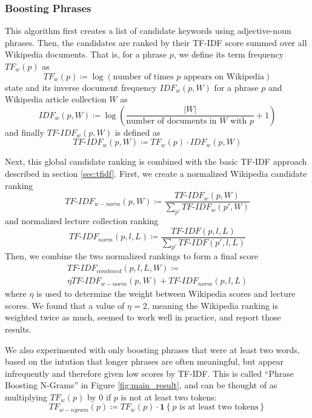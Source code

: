 \subsubsection{Boosting Phrases}

This algorithm first creates a list of candidate keywords using adjective-noun phrases. Then, the candidates are ranked by their TF-IDF score summed over all Wikipedia documents. That is, for a phrase $p$, we define its term frequency $TF_w(p)$ as
\begin{equation*}
TF_w(p) \coloneqq \log\left(\text{number of times } p \text{ appears on Wikipedia}\right)
\end{equation*}state
and its inverse document frequency $IDF_w(p, W)$ for a phrase $p$ and Wikipedia article collection $W$ as
\begin{equation*}
IDF_w(p, W) \coloneqq \log\left(\frac{|W|}{\text{number of documents in } W \text{ with } p} + 1\right)
\end{equation*}
and finally $TF\text{-}IDF_w(p, W)$ is defined as
\begin{equation*}
TF\text{-}IDF_w(p, W) \coloneqq TF_w(p) \cdot IDF_w(p, W)
\end{equation*}

Next, this global candidate ranking is combined with the basic TF-IDF approach described in section \ref{sec:tfidf}. First, we create a normalized Wikipedia candidate ranking
\begin{equation*}
TF\text{-}IDF_{w-norm}(p, W) \coloneqq \frac{TF\text{-}IDF_w(p, W)}{\sum_{p'} TF\text{-}IDF_w(p', W)}
\end{equation*}
and normalized lecture collection ranking
\begin{equation*}
TF\text{-}IDF_{norm}(p, l, L) \coloneqq \frac{TF\text{-}IDF(p, l, L)}{\sum_{p'} TF\text{-}IDF(p', l, L)}
\end{equation*}
Then, we combine the two normalized rankings to form a final score
\begin{multline*}
TF\text{-}IDF_{combined}(p, l, L, W) \coloneqq \\ \eta TF\text{-}IDF_{w-norm}(p, W) + TF\text{-}IDF_{norm}(p, l, L)
\end{multline*}
where $\eta$ is used to determine the weight between Wikipedia scores and lecture scores. We found that a value of $\eta = 2$, meaning the Wikipedia ranking is weighted twice as much, seemed to work well in practice, and report those results.

We also experimented with only boosting phrases that were at least two words, based on the intution that longer phrases are often meaningful, but appear infrequently and therefore given low scores by TF-IDF. This is called ``Phrase Boosting N-Grams'' in Figure \ref{fig:main_result}, and can be thought of as multiplying $TF_w(p)$ by 0 if $p$ is not at least two tokens:
\begin{equation*}
TF_{w-ngram}(p) \coloneqq TF_w(p) \cdot \mathbf{1}\left\{p \text{ is at least two tokens}\right\}
\end{equation*}

